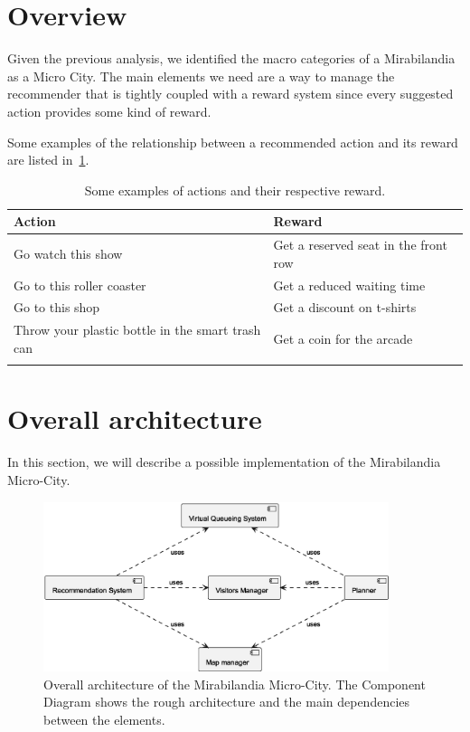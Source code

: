 \section{Overview}\label{sec:overview}
Given the previous analysis, we identified the macro categories of a Mirabilandia as a Micro City. The main elements we need are a way to manage the
recommender that is tightly coupled with a reward system since every suggested action provides some kind of reward.

Some examples of the relationship between a recommended action and its reward are listed in~\ref{tab:actions-rewards}.
\begin{longtable}{|l|l|}
	\hline
	\textbf{Action}                                  & \textbf{Reward}                      \\
	\hline
	Go watch this show                               & Get a reserved seat in the front row \\
	\hline
	Go to this roller coaster                        & Get a reduced waiting time           \\
	\hline
	Go to this shop                                  & Get a discount on t-shirts           \\
	\hline
	Throw your plastic bottle in the smart trash can & Get a coin for the arcade            \\
	\hline
	\caption{Some examples of actions and their respective reward.}
	\label{tab:actions-rewards}
\end{longtable}

\section{Overall architecture}\label{sec:mira-microcity}

In this section, we will describe a possible implementation of the Mirabilandia Micro-City.

\begin{figure}[H]
	\centering
	\includegraphics[width=0.9\textwidth]{img/architecture-overview.eps}
	\caption{Overall architecture of the Mirabilandia Micro-City.
		The Component Diagram shows the rough architecture and the main dependencies between the elements.
	}
	\label{fig:architecture-overview}
\end{figure}

